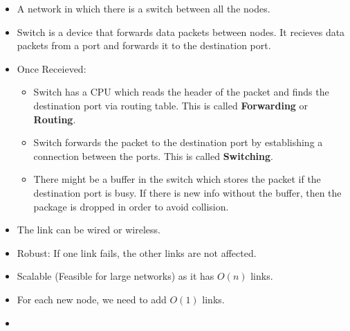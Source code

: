\documentclass[a4paper, twoside]{report}
\begin{document}
\begin{itemize}
    \item A network in which there is a switch between all the nodes.
    \item Switch is a device that forwards data packets between nodes. It recieves data packets from a port and forwards it to the destination port.
    \item Once Receieved: \begin{itemize}
        \item Switch has a CPU which reads the header of the packet and finds the destination port via routing table. This is called \textbf{Forwarding} or \textbf{Routing}.
        \item Switch forwards the packet to the destination port by establishing a connection between the ports. This is called \textbf{Switching}.
        \item There might be a buffer in the switch which stores the packet if the destination port is busy. If there is new info without the buffer, then the package is dropped in order to avoid collision.
    \end{itemize}
    \item The link can be wired or wireless.
    \item Robust: If one link fails, the other links are not affected.
    \item Scalable (Feasible for large networks) as it has $O(n)$ links.
    \item For each new node, we need to add $O(1)$ links.
    \item %
\end{itemize}
\end{document}
